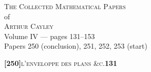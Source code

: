 \documentclass[11pt]{article}
\begin{document}
\thispagestyle{empty}
\begin{center}
\vspace*{2cm}
{\Large\scshape The Collected Mathematical Papers}\\[0.4em]
{\large of}\\[0.4em]
{\Large\scshape Arthur Cayley}\\[1.5em]
{\large Volume IV --- pages 131--153}\\[0.6em]
{\normalsize Papers 250 (conclusion), 251, 252, 253 (start)}\\[2em]
\vfill
\end{center}
\newpage

\setcounter{page}{131}


\noindent\textbf{[250]}\hfill\textsc{l'enveloppe des plans \&c.}\hfill\textbf{131}

\medskip
\end{document}
